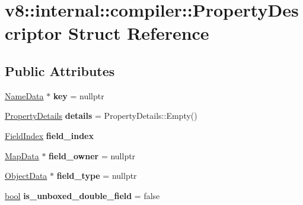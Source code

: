 \hypertarget{structv8_1_1internal_1_1compiler_1_1PropertyDescriptor}{}\section{v8\+:\+:internal\+:\+:compiler\+:\+:Property\+Descriptor Struct Reference}
\label{structv8_1_1internal_1_1compiler_1_1PropertyDescriptor}
\subsection*{Public Attributes}
\begin{DoxyCompactItemize}
\item 
\mbox{\label{structv8_1_1internal_1_1compiler_1_1PropertyDescriptor_a76c41bdf326697e85df3b2184e90ac21}} 
\mbox{\hyperlink{classv8_1_1internal_1_1compiler_1_1NameData}{Name\+Data}} $\ast$ {\bfseries key} = nullptr
\item 
\mbox{\label{structv8_1_1internal_1_1compiler_1_1PropertyDescriptor_a1c19ddc807446942de50de74e9eceebb}} 
\mbox{\hyperlink{classv8_1_1internal_1_1PropertyDetails}{Property\+Details}} {\bfseries details} = Property\+Details\+::\+Empty()
\item 
\mbox{\label{structv8_1_1internal_1_1compiler_1_1PropertyDescriptor_a6ba6148ca06d26ff100daace63e4f538}} 
\mbox{\hyperlink{classv8_1_1internal_1_1FieldIndex}{Field\+Index}} {\bfseries field\+\_\+index}
\item 
\mbox{\label{structv8_1_1internal_1_1compiler_1_1PropertyDescriptor_a57a48d90957039ed8cf5bedc4f5785d9}} 
\mbox{\hyperlink{classv8_1_1internal_1_1compiler_1_1MapData}{Map\+Data}} $\ast$ {\bfseries field\+\_\+owner} = nullptr
\item 
\mbox{\label{structv8_1_1internal_1_1compiler_1_1PropertyDescriptor_ad5bfd9b1e71c9a8d5a82927d00a6db45}} 
\mbox{\hyperlink{classv8_1_1internal_1_1compiler_1_1ObjectData}{Object\+Data}} $\ast$ {\bfseries field\+\_\+type} = nullptr
\item 
\mbox{\label{structv8_1_1internal_1_1compiler_1_1PropertyDescriptor_a9c8d35e497c8033473c9ba982944bcec}} 
\mbox{\hyperlink{classbool}{bool}} {\bfseries is\+\_\+unboxed\+\_\+double\+\_\+field} = false
\end{DoxyCompactItemize}


